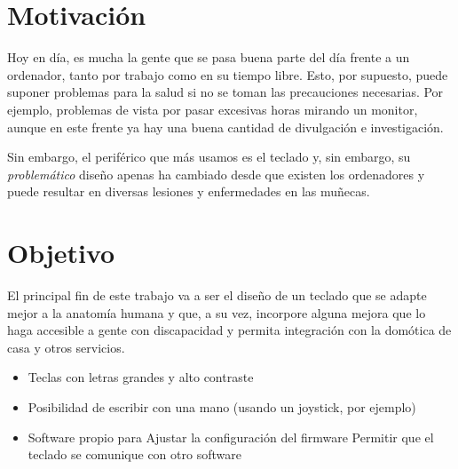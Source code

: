 \section{Motivación}
Hoy en día, es mucha la gente que se pasa buena parte del día frente a un ordenador, tanto por trabajo como en su tiempo libre. Esto, por supuesto, puede suponer problemas para la salud si no se toman las precauciones necesarias. Por ejemplo, problemas de vista por pasar excesivas horas mirando un monitor, aunque en este frente ya hay una buena cantidad de divulgación e investigación.

Sin embargo, el periférico que más usamos es el teclado y, sin embargo, su \emph{problemático} diseño apenas ha cambiado desde que existen los ordenadores y puede resultar en diversas lesiones y enfermedades en las muñecas.

\section{Objetivo}
El principal fin de este trabajo va a ser el diseño de un teclado que se adapte mejor a la anatomía humana y que, a su vez, incorpore alguna mejora que lo haga accesible a gente con discapacidad y permita integración con la domótica\cite{home-assistant} de casa y otros servicios.
\begin{itemize}
  \item Teclas con letras grandes y alto contraste
  \item Posibilidad de escribir con una mano (usando un joystick, por ejemplo)
  \item Software propio para
    \subitem Ajustar la configuración del firmware
    \subitem Permitir que el teclado se comunique con otro software
\end{itemize}
